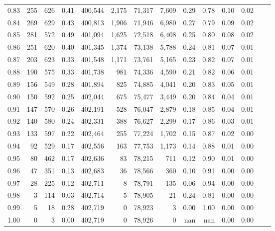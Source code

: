 \begin{tabular}{rrrrrrrrrrrrrr}
0.83 &     255 &    626 &    0.41 &  400,544 &    2,175 &  71,317 &   7,609 &  0.29 &  0.78 &  0.10 &      0.02 \\
0.84 &     269 &    629 &    0.43 &  400,813 &    1,906 &  71,946 &   6,980 &  0.27 &  0.79 &  0.09 &      0.02 \\
0.85 &     281 &    572 &    0.49 &  401,094 &    1,625 &  72,518 &   6,408 &  0.25 &  0.80 &  0.08 &      0.02 \\
0.86 &     251 &    620 &    0.40 &  401,345 &    1,374 &  73,138 &   5,788 &  0.24 &  0.81 &  0.07 &      0.01 \\
0.87 &     203 &    623 &    0.33 &  401,548 &    1,171 &  73,761 &   5,165 &  0.23 &  0.82 &  0.07 &      0.01 \\
0.88 &     190 &    575 &    0.33 &  401,738 &      981 &  74,336 &   4,590 &  0.21 &  0.82 &  0.06 &      0.01 \\
0.89 &     156 &    549 &    0.28 &  401,894 &      825 &  74,885 &   4,041 &  0.20 &  0.83 &  0.05 &      0.01 \\
0.90 &     150 &    592 &    0.25 &  402,044 &      675 &  75,477 &   3,449 &  0.20 &  0.84 &  0.04 &      0.01 \\
0.91 &     147 &    570 &    0.26 &  402,191 &      528 &  76,047 &   2,879 &  0.18 &  0.85 &  0.04 &      0.01 \\
0.92 &     140 &    580 &    0.24 &  402,331 &      388 &  76,627 &   2,299 &  0.17 &  0.86 &  0.03 &      0.01 \\
0.93 &     133 &    597 &    0.22 &  402,464 &      255 &  77,224 &   1,702 &  0.15 &  0.87 &  0.02 &      0.00 \\
0.94 &      92 &    529 &    0.17 &  402,556 &      163 &  77,753 &   1,173 &  0.14 &  0.88 &  0.01 &      0.00 \\
0.95 &      80 &    462 &    0.17 &  402,636 &       83 &  78,215 &     711 &  0.12 &  0.90 &  0.01 &      0.00 \\
0.96 &      47 &    351 &    0.13 &  402,683 &       36 &  78,566 &     360 &  0.10 &  0.91 &  0.00 &      0.00 \\
0.97 &      28 &    225 &    0.12 &  402,711 &        8 &  78,791 &     135 &  0.06 &  0.94 &  0.00 &      0.00 \\
0.98 &       3 &    114 &    0.03 &  402,714 &        5 &  78,905 &      21 &  0.24 &  0.81 &  0.00 &      0.00 \\
0.99 &       5 &     18 &    0.28 &  402,719 &        0 &  78,923 &       3 &  0.00 &  1.00 &  0.00 &      0.00 \\
1.00 &       0 &      3 &    0.00 &  402,719 &        0 &  78,926 &       0 &   nan &   nan &  0.00 &      0.00 \\
\bottomrule
\end{tabular}
